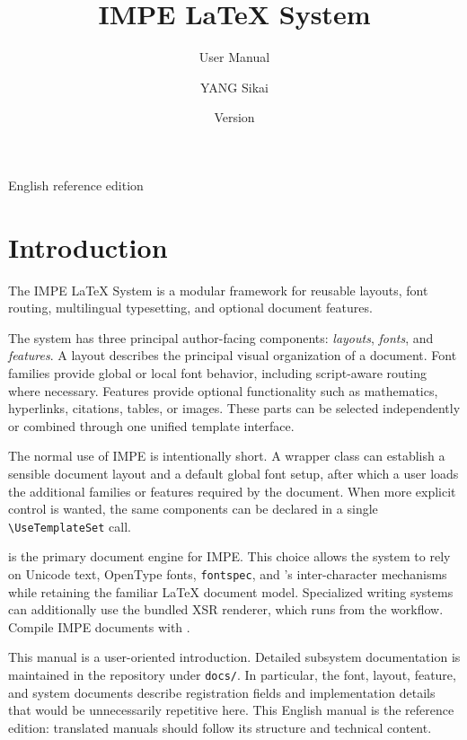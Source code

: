 \documentclass[11pt]{impeart}
\title{IMPE \LaTeX{} System}
\subtitle{User Manual}
\author{YANG Sikai}
\date{Version \IMPEVersion}
\begin{document}
\maketitle

\begin{center}
\small English reference edition
\end{center}

\tableofcontents

\section{Introduction}

The IMPE \LaTeX{} System is a modular \XeLaTeX{} framework for reusable layouts,
font routing, multilingual typesetting, and optional document features.

The system has three principal author-facing components:
\emph{layouts}, \emph{fonts}, and \emph{features}.  A layout describes the principal visual
organization of a document.  Font families provide global or local font
behavior, including script-aware routing where necessary.  Features provide
optional functionality such as mathematics, hyperlinks, citations, tables, or
images.  These parts can be selected independently or combined through one
unified template interface.

The normal use of IMPE is intentionally short.  A wrapper class can establish a
sensible document layout and a default global font setup, after which a user
loads the additional families or features required by the document. When
more explicit control is wanted, the same components can be declared in a
single \verb|\UseTemplateSet| call.

\XeLaTeX{} is the primary document engine for IMPE.  This choice allows the system
to rely on Unicode text, OpenType fonts, \texttt{fontspec}, and \XeTeX{}'s
inter-character mechanisms while retaining the familiar \LaTeX{} document model.
Specialized writing systems can additionally use the bundled XSR renderer,
which runs from the \XeLaTeX{} workflow. Compile IMPE documents with
\XeLaTeX{}.

This manual is a user-oriented introduction. Detailed subsystem documentation is maintained in the
repository under \texttt{docs/}.  In particular, the font, layout, feature, and
system documents describe registration fields and implementation details that
would be unnecessarily repetitive here.  This English manual is the reference
edition: translated manuals should follow its structure and technical content.
\end{document}

